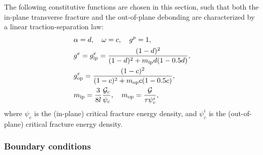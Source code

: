 The following constitutive functions are chosen in this section, such that both the in-plane transverse fracture and the out-of-plane debonding are characterized by a linear traction-separation law:
\begin{subequations}
  \begin{align}
     & \alpha = d, \quad \omega = c, \quad g^p = 1,                                                           \\
     & g^e = g^e_\text{ip} = \dfrac{(1-d)^2}{(1-d)^2 + m_\text{ip} d (1 - 0.5 d)},                            \\
     & g^e_\text{op} = \dfrac{(1-c)^2}{(1-c)^2 + m_\text{op} c (1 - 0.5 c)},                                  \\
     & m_\text{ip} = \dfrac{3}{8l}\dfrac{{\mathcal{G}_c}}{\psi_c}, \quad m_\text{op} = \dfrac{\mathcal{G}}{\tau\psi^i_c}, 
  \end{align}
\end{subequations}
where $\psi_c$ is the (in-plane) critical fracture energy density, and $\psi^i_c$ is the (out-of-plane) critical fracture energy density.

\subsubsection{Boundary conditions}

